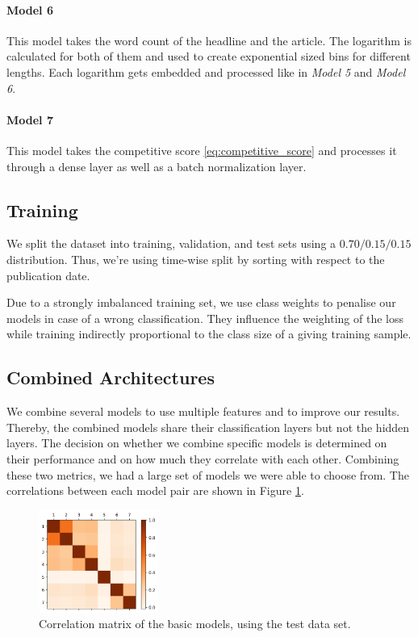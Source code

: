\paragraph{Model 6} 
This model takes the word count of the headline and the article. The logarithm is calculated for both of them and used to create exponential sized bins for different lengths. Each logarithm gets embedded and processed like in \textit{Model 5} and \textit{Model 6}.

\paragraph{Model 7} 
This model takes the competitive score \ref{eq:competitive_score} and processes it through a dense layer as well as a batch normalization layer.

\subsection{Training}
We split the dataset into training, validation, and test sets using a $0.70/0.15/0.15$ distribution. Thus, we're using time-wise split by sorting with respect to the publication date.

Due to a strongly imbalanced training set, we use class weights to penalise our models in case of a wrong classification. They influence the weighting of the loss while training indirectly proportional to the class size of a giving training sample.

\subsection{Combined Architectures}
We combine several models to use multiple features and to improve our results. Thereby, the combined models share their classification layers but not the hidden layers.
The decision on whether we combine specific models is determined on their performance and on how much they correlate with each other. Combining these two metrics, we had a large set of models we were able to choose from. The correlations between each model pair are shown in Figure \ref{fig:correlation_matrix}. 

\begin{figure}
	\includegraphics[width=0.35\textwidth]{fig/correlations.png}
	\caption{\textmd{Correlation matrix of the basic models, using the test data set.}}
	\label{fig:correlation_matrix}
\end{figure}